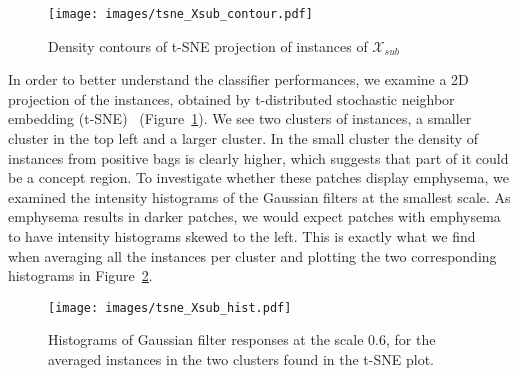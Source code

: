 \documentclass[10pt,conference,a4paper]{IEEEtran}
\begin{document}


\begin{figure}[ht]
 \begin{center}
  \texttt{[image: images/tsne\_Xsub\_contour.pdf]}
 \end{center}
 \caption[]{Density contours of t-SNE projection of instances of $\mathcal{X}_{sub}$}
 \label{fig:tsne}
\end{figure}

In order to better understand the classifier performances, we examine a 2D projection of the instances, obtained by t-distributed stochastic neighbor embedding (t-SNE)~\cite{van2008visualizing} (Figure~\ref{fig:tsne}). We see two clusters of instances, a smaller cluster in the top left and a larger cluster. In the small cluster the density of instances from positive bags is clearly higher, which suggests that part of it could be a concept region. To investigate whether these patches display emphysema, we examined the intensity histograms of the Gaussian filters at the smallest scale. As emphysema results in darker patches, we would expect patches with emphysema to have intensity histograms skewed to the left. This is exactly what we find when averaging all the instances per cluster and plotting the two corresponding histograms in Figure~\ref{fig:hist}.

\begin{figure}[ht]
 \centering
  \texttt{[image: images/tsne\_Xsub\_hist.pdf]}

 \caption[]{Histograms of Gaussian filter responses at the scale 0.6, for the averaged instances in the two clusters found in the t-SNE plot.}
 \label{fig:hist}
\end{figure}
\end{document}
